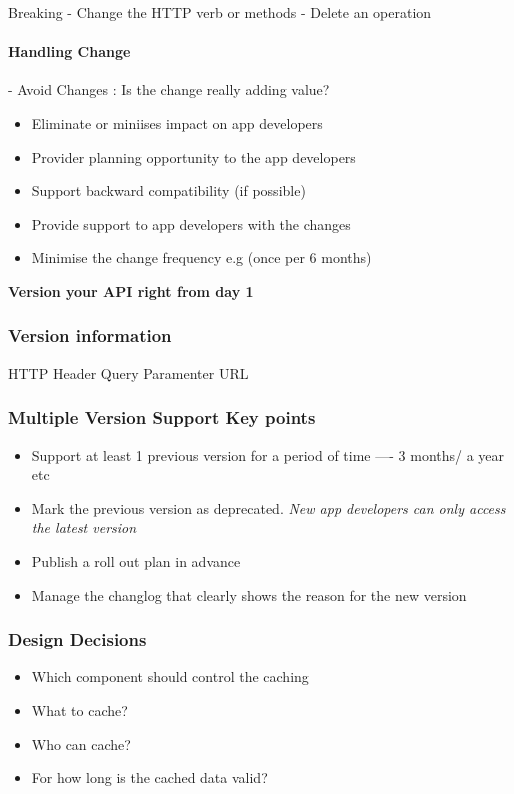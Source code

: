 \documentclass[a4paper, 11pt]{book}
\begin{document}
    Breaking
    - Change the HTTP verb or methods
    - Delete an operation

    \paragraph{Handling Change}
    - Avoid Changes : Is the change really adding value?
    \begin{itemize}
        \item Eliminate or miniises impact on app developers
        \item Provider planning opportunity to the app developers
        \item Support backward compatibility (if possible)
        \item Provide support to app developers with the changes
        \item Minimise the change frequency e.g (once per 6 months)
    \end{itemize}
    \textbf{Version your API right from day 1}

    \subsubsection{Version information}
    HTTP Header
    Query Paramenter
    URL

    \subsubsection{Multiple Version Support Key points}
    \begin{itemize}
        \item Support at least 1 previous version for a period of time ---- 3 months/ a year etc
        \item Mark the previous version as deprecated. \textit{New app developers can only access the latest version}
        \item Publish a roll out plan in advance
        \item Manage the changlog that clearly shows the reason for the new version
    \end{itemize}

    \subsubsection{Design Decisions}
\begin{itemize}
    \item Which component should control the caching
    \item What to cache?
    \item Who can cache?
    \item For how long is the cached data valid?
\end{itemize}
\end{document}
